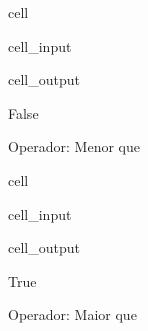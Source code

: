 \documentclass[letterpaper,10pt,english]{jupyterBook}
\begin{document}
\begin{sphinxuseclass}{cell}\begin{sphinxVerbatimInput}

\begin{sphinxuseclass}{cell_input}
\begin{sphinxVerbatim}[commandchars=\\\{\}]
\end{sphinxVerbatim}

\end{sphinxuseclass}\end{sphinxVerbatimInput}
\begin{sphinxVerbatimOutput}

\begin{sphinxuseclass}{cell_output}
\begin{sphinxVerbatim}[commandchars=\\\{\}]
False
\end{sphinxVerbatim}

\end{sphinxuseclass}\end{sphinxVerbatimOutput}

\end{sphinxuseclass}
\sphinxAtStartPar
Operador: Menor que

\begin{sphinxuseclass}{cell}\begin{sphinxVerbatimInput}

\begin{sphinxuseclass}{cell_input}
\begin{sphinxVerbatim}[commandchars=\\\{\}]
\end{sphinxVerbatim}

\end{sphinxuseclass}\end{sphinxVerbatimInput}
\begin{sphinxVerbatimOutput}

\begin{sphinxuseclass}{cell_output}
\begin{sphinxVerbatim}[commandchars=\\\{\}]
True
\end{sphinxVerbatim}

\end{sphinxuseclass}\end{sphinxVerbatimOutput}

\end{sphinxuseclass}
\sphinxAtStartPar
Operador: Maior que
\end{document}
